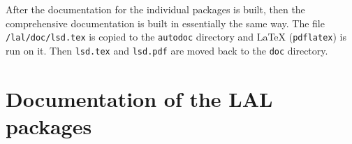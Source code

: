 \documentclass[oneside]{book}
\begin{document}
After the documentation for the individual packages is built, then the
comprehensive documentation is built in essentially the same way.  The
file {\tt /lal/doc/lsd.tex} is copied to the {\tt autodoc} directory
and {\LaTeX}  ({\tt pdflatex}) is run on it. Then  {\tt lsd.tex} and
{\tt lsd.pdf} are moved back to the {\tt doc} directory.



\part{Documentation of the LAL packages}














%













%



\backmatter

\pagebreak
{}%
\nopagebreak
\printindex
\end{document}
